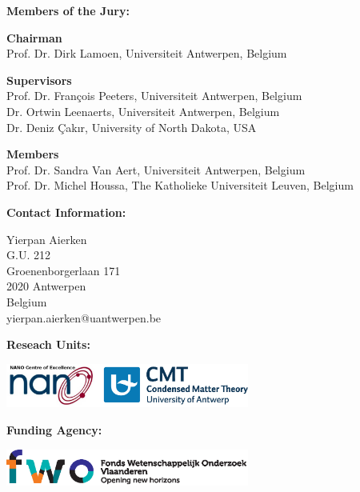 \clearpage

\thispagestyle{empty}

\begin{list}{}{\leftmargin=0cm}

\item \textbf{Members of the Jury:}

\item \textbf{Chairman} \\
Prof. Dr. Dirk Lamoen, Universiteit Antwerpen, Belgium

\item \textbf{Supervisors} \\
Prof. Dr. Fran\c{c}ois Peeters, Universiteit Antwerpen, Belgium\\
Dr. Ortwin Leenaerts, Universiteit Antwerpen, Belgium\\
Dr. Deniz Çakır, University of North Dakota, USA


\item \textbf{Members} \\
Prof. Dr. Sandra Van Aert, Universiteit Antwerpen, Belgium \\
Prof. Dr. Michel Houssa, The Katholieke Universiteit Leuven, Belgium \\
\end{list}

\vspace{0.7cm}

\begin{list}{}{\leftmargin=0cm}
            \item \textbf{Contact Information:}
            \item    Yierpan Aierken \\
            G.U. 212 \\
            Groenenborgerlaan 171 \\
            2020 Antwerpen \\
            Belgium \\
            yierpan.aierken@uantwerpen.be
\end{list}
\vspace{0.7cm}

\begin{list}{}{\leftmargin=0cm}
\item \textbf{Reseach Units:}
\begin{flushleft}
\includegraphics[width =0.6\textwidth]{Figs/research_units.eps}
\end{flushleft}
\end{list}

\vfill
\begin{list}{}{\leftmargin=0cm}
\item \textbf{Funding Agency:}
\begin{flushleft}
\includegraphics[width =0.6\textwidth]{Figs/FWO.eps}
\end{flushleft}
\end{list}